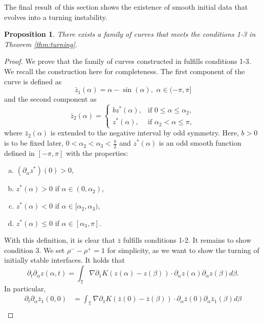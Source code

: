 \documentclass[11pt]{article}
\numberwithin{equation}{section}
\newtheorem{prop}[thm]{Proposition}
\newcommand{\p}{\partial}
\begin{document}
The final result of this section shows the existence of smooth initial data that evolves into a turning instability. 

\begin{prop} \label{prop:turning1}
    There exists a family of curves that meets the conditions 1-3 in Theorem \ref{thm:turning}.
\end{prop}
\begin{proof}
We prove that the family of curves constructed in  \cite{castro2012rayleigh} fulfills conditions 1-3. We recall the construction here for completeness. The first component of the curve is defined as 
     $$\bar{z}_1(\alpha) = \alpha-\sin(\alpha), \,\, \alpha \in (-\pi,\pi]$$
     and the second component as 
    \[
\bar{z}_2(\alpha) =
\begin{cases}
b z^*(\alpha), & \text{if } 0\leq \alpha \leq \alpha_2, \\
z^*(\alpha),  & \text{if } \alpha_2 < \alpha \leq \pi,
\end{cases}
\]
where $\bar{z}_2(\alpha)$ is extended to the negative interval by odd symmetry. Here, $b>0$ is to be fixed later, $0 < \alpha_2 < \alpha_3 < \frac{\pi}{2}$ and  $z^\ast(\alpha)$ is an odd smooth function defined in $[-\pi,\pi]$ with the properties:
\begin{enumerate}[(a)]
    \item \( \left( \partial_\alpha z^* \right)(0) > 0 \),
    \item \( z^*(\alpha) > 0 \) if \( \alpha \in (0, \alpha_2) \), 
    \item \( z^*(\alpha) < 0 \) if \( \alpha \in [\alpha_2, \alpha_3) \), 
    \item \( z^*(\alpha) \leq 0 \) if \( \alpha \in [\alpha_3, \pi] \).
\end{enumerate}
 With this definition, it is clear that $\bar{z}$ fulfills conditions 1-2. It remains to show condition 3.  We set $\rho^--\rho^+ = 1$ for simplicity, as we want to show the turning of initially stable interfaces. It holds that 
\begin{equation*}
    \partial_t \partial_\alpha  z(\alpha,t) = \int_\mathbb{T} \nabla \p_1 K(  z(\alpha) - {z}(\beta)) \cdot \partial_\alpha z(\alpha) \partial_\alpha  z(\beta) d\beta .
\end{equation*}
In particular, 
\begin{align}
     \partial_t \partial_\alpha \bar z_1(0,0) &= \int_\mathbb{T} \nabla \p_1 K( \bar z(0) - \bar{z}(\beta)) \cdot \partial_\alpha \bar z(0) \partial_\alpha \bar z_1(\beta) d\beta \nonumber  \\

\end{align}
\end{proof}
\end{document}

